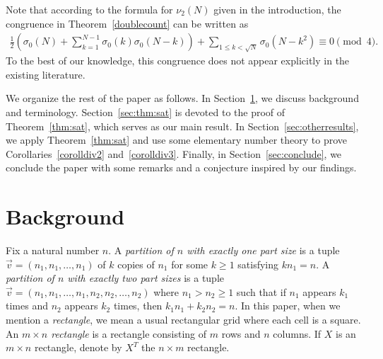 \documentclass[a4paper,oneside,reqno]{amsart}
\theoremstyle{plain}
\theoremstyle{definition}
\theoremstyle{remark}
\begin{document}
    Note that according to the formula for $\nu_2(N)$ given in the introduction, 
    the congruence in Theorem~\ref{doublecount} can be written as 
    \begin{align*}
        \frac{1}{2} \left( \sigma_0(N) + \sum_{k=1}^{N-1} \sigma_0(k)\sigma_0(N-k) \right) + \sum_{1 \leq k < \sqrt{N}} \sigma_0 (N - k^2) \equiv 0 \pmod 4. 
    \end{align*}
    To the best of our knowledge, this congruence does not appear explicitly in the existing literature. 
	
	We organize the rest of the paper as follows. In Section~\ref{sec:bckgrnd}, we discuss background and terminology. Section~\ref{sec:thm:sat} is devoted to the proof of Theorem~\ref{thm:sat}, which serves as our main result. In Section~\ref{sec:otherresults}, we apply Theorem~\ref{thm:sat} and use some elementary number theory to prove Corollaries~\ref{corolldiv2} and~\ref{corolldiv3}. Finally, in Section~\ref{sec:conclude}, we conclude the paper with some remarks and a conjecture inspired by our findings.
	
	
	
	\section{Background}
	\label{sec:bckgrnd}
	
	
	Fix a natural number $n$. A {\em partition of $n$ with exactly one part size} is a tuple $\vec{v}=(n_1,n_1,\hdots, n_1)$ of $k$ copies of $n_1$ for some $k\geq 1$ satisfying $kn_1=n$.
	A {\em partition of $n$ with exactly two part sizes} is a tuple $\vec{v}=(n_1,n_1, \hdots, n_1,n_2,n_2, \hdots, n_2)$ where $n_1>n_2 \geq 1$ such that if $n_1$ appears $k_1$ times and $n_2$ appears $k_2$ times, then $k_1n_1+k_2n_2=n$. 
    In this paper, when we mention a {\em rectangle}, we mean a usual rectangular grid where each cell is a square. An {\em $m \times n$ rectangle} is a rectangle consisting of $m$ rows and $n$ columns. If $X$ is an $m \times n$ rectangle, denote by $X^T$ the $n \times m$ rectangle. 
	
\end{document}
